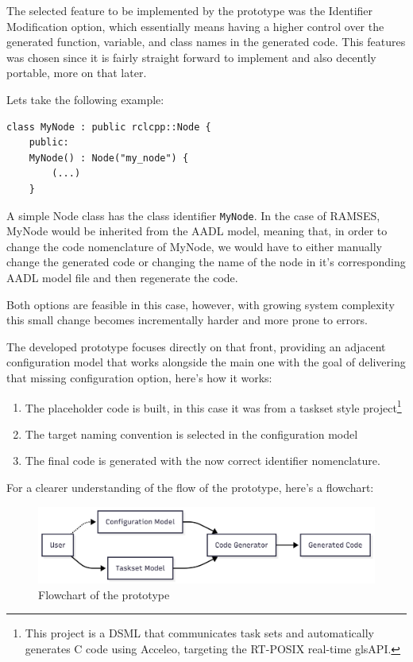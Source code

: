 The selected feature to be implemented by the prototype was the Identifier Modification option, which essentially means having a higher control over the generated function, variable, and class names in the generated code. This features was chosen since it is fairly straight forward to implement and also decently portable, more on that later. 

Lets take the following example:

\begin{verbatim}
class MyNode : public rclcpp::Node {
	public:
	MyNode() : Node("my_node") {
		(...)
	}
\end{verbatim}

A simple Node class has the class identifier \texttt{MyNode}. In the case of \gls{RAMSES}, MyNode would be inherited from the AADL model, meaning that, in order to change the code nomenclature of MyNode, we would have to either manually change the generated code or changing the name of the node in it's corresponding AADL model file and then regenerate the code.

Both options are feasible in this case, however, with growing system complexity this small change becomes incrementally harder and more prone to errors.

The developed prototype focuses directly on that front, providing an adjacent configuration model that works alongside the main one with the goal of delivering that missing configuration option, here's how it works:

\begin{enumerate}
	\item The placeholder code is built, in this case it was from a taskset style project\footnote{This project is a \gls{DSML} that communicates task sets and automatically generates C code using Acceleo, targeting the RT-POSIX real-time gls{API}.}
	\item The target naming convention is selected in the configuration model
	\item The final code is generated with the now correct identifier nomenclature.
\end{enumerate}
 
 
For a clearer understanding of the flow of the prototype, here's a flowchart:

\begin{figure}[htbp]
	\centering
	\includegraphics[height=0.22\textwidth]{prototype_flowchart.png}
	\caption{Flowchart of the prototype}
	\label{fig:prototype_flowchart}
\end{figure}

